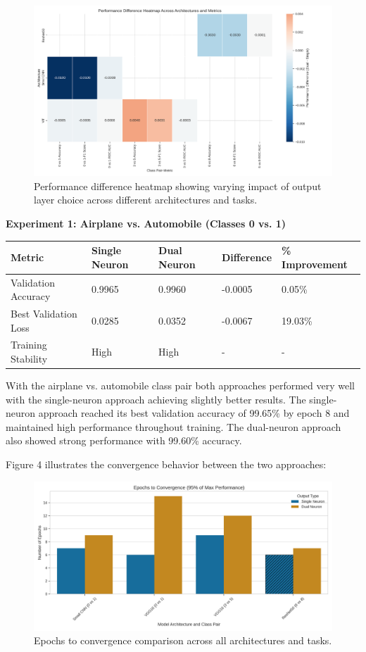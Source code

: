 \documentclass[11pt]{article}
\begin{document}
\begin{figure}[htbp]
\centering
\includegraphics[width=\textwidth]{figures/performance_difference_heatmap.png}
\caption{Performance difference heatmap showing varying impact of output layer choice across different architectures and tasks.}
\end{figure}

\textbf{Experiment 1: Airplane vs. Automobile (Classes 0 vs. 1)}

\begin{tabular}{lllll}
\hline
Metric & Single Neuron & Dual Neuron & Difference & \% Improvement \\
\hline
Validation Accuracy & 0.9965 & 0.9960 & -0.0005 & 0.05\% \\
Best Validation Loss & 0.0285 & 0.0352 & -0.0067 & 19.03\% \\
Training Stability & High & High & - & - \\
\hline
\end{tabular}

With the airplane vs. automobile class pair both approaches performed very well with the single-neuron approach achieving slightly better results. The single-neuron approach reached its best validation accuracy of 99.65\% by epoch 8 and maintained high performance throughout training. The dual-neuron approach also showed strong performance with 99.60\% accuracy.

Figure 4 illustrates the convergence behavior between the two approaches:

\begin{figure}[htbp]
\centering
\includegraphics[width=\textwidth]{figures/convergence_rate_comparison.png}
\caption{Epochs to convergence comparison across all architectures and tasks.}
\end{figure}
\end{document}
